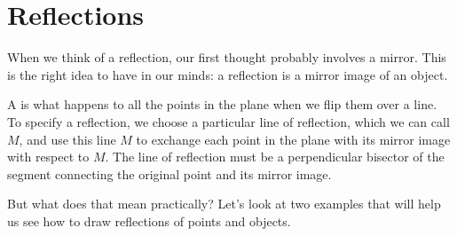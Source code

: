 \documentclass{ximera}
\begin{document}
\section{Reflections}
When we think of a reflection, our first thought probably involves a mirror. This is the right idea to have in our minds: a reflection is a mirror image of an object.
\begin{definition}
A  is what happens to all the points in the plane when we flip them over a line. To specify a reflection, we choose a particular line of reflection, which we can call $M$, and use this line $M$ to exchange each point in the plane with its mirror image with respect to $M$. The line of reflection must be a perpendicular bisector of the segment connecting the original point and its mirror image.
\end{definition}
 But what does that mean practically? Let's look at two examples that will help us see how to draw reflections of points and objects.
\end{document}
